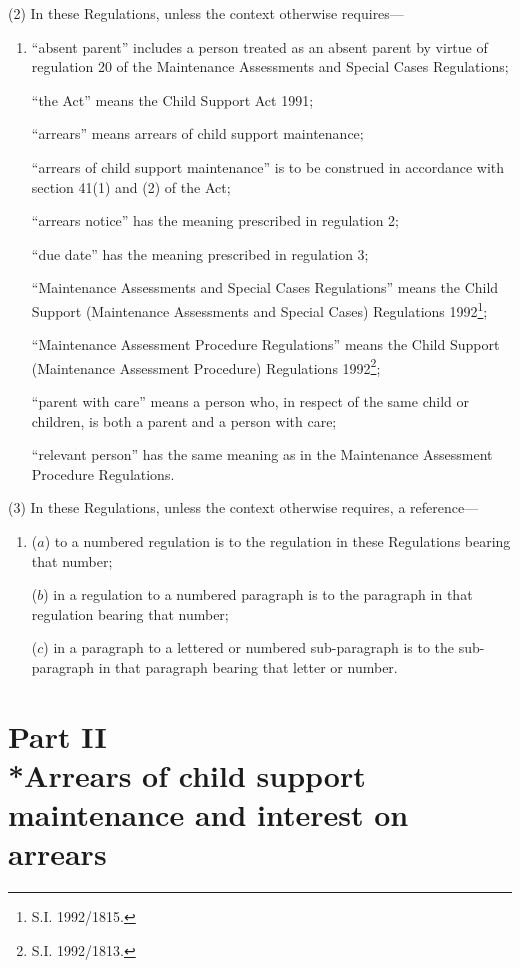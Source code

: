 \documentclass[a4paper]{article}
\begin{document}
(2) In these Regulations, unless the context otherwise requires—
\begin{enumerate}\item[]
“absent parent” includes a person treated as an absent parent by virtue of regulation 20 of the Maintenance Assessments and Special Cases Regulations;

“the Act” means the Child Support Act 1991;

“arrears” means arrears of child support maintenance;

“arrears of child support maintenance” is to be construed in accordance with section 41(1) and (2) of the Act;

“arrears notice” has the meaning prescribed in regulation 2;

“due date” has the meaning prescribed in regulation 3;

“Maintenance Assessments and Special Cases Regulations” means the Child Support (Maintenance Assessments and Special Cases) Regulations 1992\footnote{\frenchspacing S.I. 1992/1815.};

“Maintenance Assessment Procedure Regulations” means the Child Support (Maintenance Assessment Procedure) Regulations 1992\footnote{\frenchspacing S.I. 1992/1813.};

“parent with care” means a person who, in respect of the same child or children, is both a parent and a person with care;

“relevant person” has the same meaning as in the Maintenance Assessment Procedure Regulations.
\end{enumerate}

(3) In these Regulations, unless the context otherwise requires, a reference—
\begin{enumerate}\item[]
($a$) to a numbered regulation is to the regulation in these Regulations bearing that number;

($b$) in a regulation to a numbered paragraph is to the paragraph in that regulation bearing that number;

($c$) in a paragraph to a lettered or numbered sub-paragraph is to the sub-paragraph in that paragraph bearing that letter or number.
\end{enumerate}

\section[Part II --- Arrears of child support maintenance and interest on arrears]{Part II\\*Arrears of child support maintenance and interest on arrears}
\end{document}
